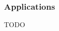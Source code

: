 \documentclass[usenames,dvipsnames,handout]{beamer}
\DeclareMathOperator{\RR}{\textbf{R}}
\DeclareMathOperator{\hausdim}{\text{dim}_{\textbf{H}}}
\DeclareMathOperator{\minkdim}{\text{dim}_{\textbf{M}}}
\begin{document}
\begin{frame}
    \frametitle{Applications}

    TODO







\end{frame}
\end{document}
